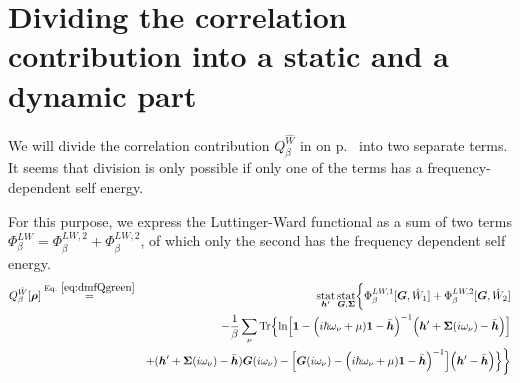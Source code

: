 \documentclass[11pt,a4paper]{report}
\begin{document}
\chapter{Dividing the correlation contribution into a static and a dynamic part}
\label{sec:sdlitcorrelation}
We will divide the correlation contribution $Q^{\hat{W}}_\beta$ in
 on p.~\pageref{eq:dmfQgreen} into two separate
terms. It seems that division is only possible if only one of the
terms has a frequency-dependent self energy.

For this purpose, we express the Luttinger-Ward functional as a sum
of two terms $\Phi^{LW}_\beta=\Phi^{LW,2}_\beta+\Phi^{LW,2}_\beta$, of
which only the second has the frequency dependent self energy.
\begin{eqnarray}
Q^{\hat{W}}_\beta[\mat{\rho}]
&\eqrel{eq:dmfQgreen}{=}&
\stat_{\mat{h}'}\stat_{\mat{G},\mat{\Sigma}}
\biggl\lbrace
\Phi^{LW,1}_\beta[\mat{G},\hat{W}_1]
+\Phi^{LW,2}_\beta[\mat{G},\hat{W}_2]
\nonumber\\
&&-\frac{1}{\beta}\sum_\nu\Tr\Bigl\lbrace
\ln\Bigl[
\mat{1}-
\Bigl(i\hbar\omega_\nu+\mu)\mat{1}-\bar{\mat{h}}\Bigr)^{-1}
\Bigl(\mat{h}'+\mat{\Sigma}(i\omega_\nu)-\bar{\mat{h}}\Bigr)
\Bigr]
\nonumber\\&&
+(\mat{h}'+\mat{\Sigma}(i\omega_\nu)-\bar{\mat{h}})\mat{G}(i\omega_\nu)
-
\Bigl[
\mat{G}(i\omega_\nu)
-\Bigl(i\hbar\omega_\nu+\mu)\mat{1}-\bar{\mat{h}}\Bigr)^{-1}
\Bigr]
\Bigl(\mat{h}'-\bar{\mat{h}}\Bigr)\Bigr\rbrace
\biggr\rbrace
\nonumber\\
\label{eq:dmfQgreenbeforedivision}
\end{eqnarray}
\end{document}

